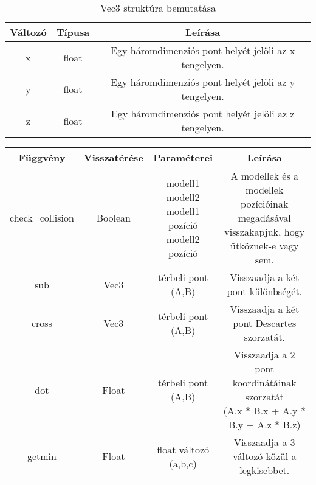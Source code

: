 \begin{table}[h]
	\centering
	\begin{tabular}{|c|c|c|}
		\hline
		\textbf{Változó}     & \textbf{Típusa}& \textbf{Leírása}\\ \hline
		x&float&Egy háromdimenziós pont helyét jelöli az x tengelyen.\\ \hline
		y&float&Egy háromdimenziós pont helyét jelöli az y tengelyen.\\ \hline
		z&float&Egy háromdimenziós pont helyét jelöli az z tengelyen.\\ \hline
		
	\end{tabular}
	\caption{Vec3 struktúra bemutatása}
	\label{tab:strukt}
\end{table}

\begin{table}[h]
	\centering
	\begin{tabular}{|c|c|c|c|}
		\hline
		\textbf{Függvény} & \textbf{Visszatérése}    & \textbf{Paraméterei}& \textbf{Leírása}\\ \hline
		
		check\_collision&Boolean&\parbox{2.7cm}{\centering modell1\\modell2\\modell1 pozíció\\modell2 pozíció}&\parbox{4.3cm}{\centering A modellek és a modellek pozícióinak megadásával visszakapjuk, hogy ütköznek-e vagy sem.}\\ \hline
		
		sub&Vec3&\parbox{2.7cm}{ térbeli pont\\(A,B)}&\parbox{4.3cm}{\centering Visszaadja a két pont különbségét.}\\ \hline
		
		cross&Vec3&\parbox{2.7cm}{ térbeli pont\\(A,B)}&\parbox{4.3cm}{\centering Visszaadja a két pont Descartes szorzatát.}\\ \hline
		
		dot&Float&\parbox{2.7cm}{ térbeli pont\\(A,B)}&\parbox{4.3cm}{\centering Visszaadja a 2 pont koordinátáinak szorzatát\\(A.x * B.x + A.y * B.y + A.z * B.z)}\\ \hline
		
		getmin&Float&\parbox{2.7cm}{ float változó\\(a,b,c)}&\parbox{4.3cm}{\centering Visszaadja a 3 változó közül a legkisebbet.}\\ \hline
		

\end{tabular}
\end{table}
